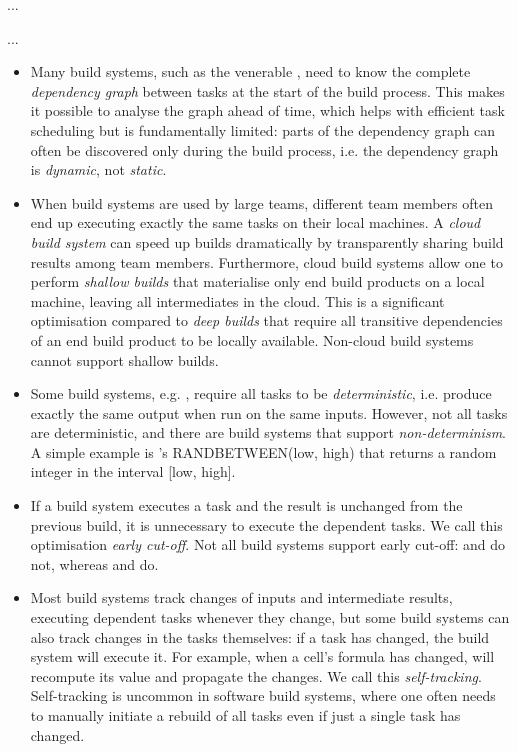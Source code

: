 ...

\Bazel

...

\begin{itemize}
    \item Many build systems, such as the venerable \Make, need to know the
    complete \emph{dependency graph} between tasks at the start of the build
    process. This makes it possible to analyse the graph ahead of time, which
    helps with efficient task scheduling but is fundamentally limited: parts of
    the dependency graph can often be discovered only during the build process,
    i.e. the dependency graph is \emph{dynamic}, not \emph{static}.

    \item When build systems are used by large teams, different team members
    often end up executing exactly the same tasks on their local machines.
    A \emph{cloud build system} can speed up builds dramatically by
    transparently sharing build results among team members. Furthermore, cloud
    build systems allow one to perform \emph{shallow builds} that materialise
    only end build products on a local machine, leaving all intermediates in the
    cloud. This is a significant optimisation compared to \emph{deep builds}
    that require all transitive dependencies of an end build product to be
    locally available. Non-cloud build systems cannot support shallow builds.

    \item Some build systems, e.g. \Buck, require all tasks to be
    \emph{deterministic}, i.e. produce exactly the same output when run on the
    same inputs. However, not all tasks are deterministic, and there are build
    systems that support \emph{non-determinism}. A simple example is \Excel's
    \textsf{RANDBETWEEN(low, high)} that returns a random integer in the
    interval \textsf{[low, high]}.

    \item If a build system executes a task and the result is unchanged from the
    previous build, it is unnecessary to execute the dependent tasks. We call
    this optimisation \emph{early cut-off}. Not all build systems support early
    cut-off: \Make and \Excel do not, whereas \Shake and \Buck do.

    \item Most build systems track changes of inputs and intermediate results,
    executing dependent tasks whenever they change, but some build systems can
    also track changes in the tasks themselves: if a task has changed, the build
    system will execute it. For example, when a cell's formula has changed,
    \Excel will recompute its value and propagate the changes. We call this
    \emph{self-tracking}. Self-tracking is uncommon in software build systems,
    where one often needs to manually initiate a rebuild of all tasks even if
    just a single task has changed.


\end{itemize}
